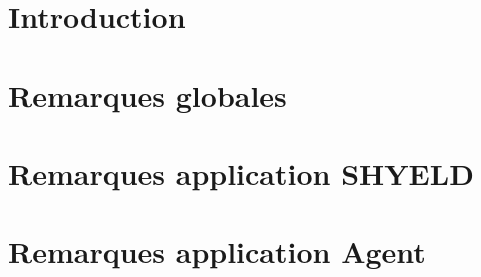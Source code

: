 \documentclass{article}[12pt]
\begin{document}


\tableofcontents%
\newpage


\section{Introduction}
\section{Remarques globales}
\section{Remarques application SHYELD}
\section{Remarques application Agent}
\end{document}
